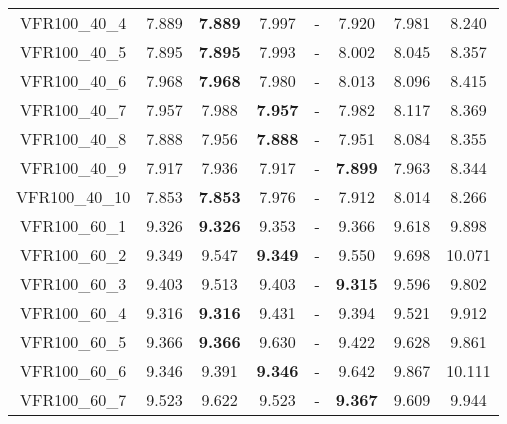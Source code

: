 \begin{tabular}{cc|ccc|ccc}
VFR100\_40\_4      & 7.889            & {\bf 7.889}      & 7.997            & -                & 7.920            & 7.981            & 8.240           \\ 
VFR100\_40\_5      & 7.895            & {\bf 7.895}      & 7.993            & -                & 8.002            & 8.045            & 8.357           \\ 
VFR100\_40\_6      & 7.968            & {\bf 7.968}      & 7.980            & -                & 8.013            & 8.096            & 8.415           \\ 
VFR100\_40\_7      & 7.957            & 7.988            & {\bf 7.957}      & -                & 7.982            & 8.117            & 8.369           \\ 
VFR100\_40\_8      & 7.888            & 7.956            & {\bf 7.888}      & -                & 7.951            & 8.084            & 8.355           \\ 
VFR100\_40\_9      & 7.917            & 7.936            & 7.917            & -                & {\bf 7.899}      & 7.963            & 8.344           \\ 
VFR100\_40\_10     & 7.853            & {\bf 7.853}      & 7.976            & -                & 7.912            & 8.014            & 8.266           \\ 
VFR100\_60\_1      & 9.326            & {\bf 9.326}      & 9.353            & -                & 9.366            & 9.618            & 9.898           \\ 
VFR100\_60\_2      & 9.349            & 9.547            & {\bf 9.349}      & -                & 9.550            & 9.698            & 10.071          \\ 
VFR100\_60\_3      & 9.403            & 9.513            & 9.403            & -                & {\bf 9.315}      & 9.596            & 9.802           \\ 
VFR100\_60\_4      & 9.316            & {\bf 9.316}      & 9.431            & -                & 9.394            & 9.521            & 9.912           \\ 
VFR100\_60\_5      & 9.366            & {\bf 9.366}      & 9.630            & -                & 9.422            & 9.628            & 9.861           \\ 
VFR100\_60\_6      & 9.346            & 9.391            & {\bf 9.346}      & -                & 9.642            & 9.867            & 10.111          \\ 
VFR100\_60\_7      & 9.523            & 9.622            & 9.523            & -                & {\bf 9.367}      & 9.609            & 9.944           \\ 

\end{tabular}
